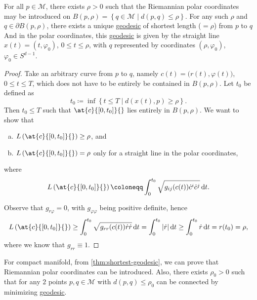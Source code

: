 \begin{theorem}\label{thm:shortest-geodesic}
	For all \(p\in \mathcal{M} \), there exists \(\rho > 0\) such that the Riemannian polar coordinates may be introduced on \(B(p, \rho ) = \left\{ q\in \mathcal{M} \mid d(p, q) \leq \rho  \right\} \). For any such \(\rho \) and \(q\in \partial B(p, \rho )\), there exists a unique \hyperref[def:geodesic]{geodesic} of shortest length (\(=\rho \)) from \(p\) to \(q\) And in the polar coordinates, this \hyperref[def:geodesic]{geodesic} is given by the straight line \(x(t) = (t, \varphi _0)\), \(0 \leq t \leq \rho \), with \(q\) represented by coordinates \((\rho , \varphi _0)\), \(\varphi _0\in S^{d-1}\).
\end{theorem}
\begin{proof}
	Take an arbitrary curve from \(p\) to \(q\), namely \(c(t) = \big(r(t), \varphi (t)\big)\), \(0 \leq t \leq T\), which does not have to be entirely be contained in \(B(p, \rho )\). Let \(t_0\) be defined as
	\[
		t_0 \coloneqq \inf \left\{ t \leq T \mid d(x(t), p) \geq \rho  \right\}.
	\]
	Then \(t_0 \leq T\) such that \(\at{c}{[0, t_0]}{} \) lies entirely in \(B(p, \rho )\). We want to show that
	\begin{enumerate}[(a)]
		\item \(L\left( \at{c}{[0, t_0]}{} \right) \geq \rho \), and
		\item \(L\left( \at{c}{[0, t_0]}{} \right) = \rho \) only for a straight line in the polar coordinates,
	\end{enumerate}
	where
	\[
		L\left( \at{c}{[0 ,t_0]}{} \right) \coloneqq \int_{0}^{t_0} \sqrt{g_{ij}(c(t)) \dot{c}^i \dot{c}^j} \,\mathrm{d}t.
	\]

	Observe that \(g_{r \varphi } = 0\), with \(g_{\varphi \varphi }\) being positive definite, hence
	\[
		L\left( \at{c}{[0, t_0]}{} \right)
		\geq \int_{0}^{t_0} \sqrt{g_{r r}(c(t)) \dot{r} \dot{r}} \,\mathrm{d}t
		= \int_{0}^{t_0} \vert \dot{r} \vert \,\mathrm{d}t
		\geq \int_{0}^{t_0} \dot{r} \,\mathrm{d}t
		= r(t_0)
		= \rho,
	\]
	where we know that \(g_{r r} \equiv 1\).
\end{proof}

\begin{remark}
	For compact manifold, from \autoref{thm:shortest-geodesic}, we can prove that Riemannian polar coordinates can be introduced. Also, there exists \(\rho _0 > 0\) such that for any \(2\) points \(p, q\in \mathcal{M} \) with \(d(p, q) \leq \rho _0\) can be connected by minimizing \hyperref[def:geodesic]{geodesic}.
\end{remark}